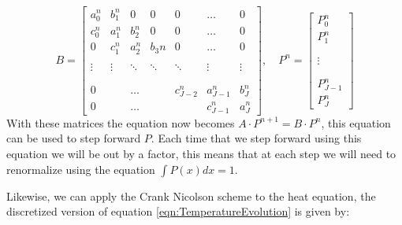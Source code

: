 \begin{equation}
B = 
\begin{bmatrix}
	a_0^{n} & b_1^{n}     & 0                 & 0          & 0                    & \dots            & 0        \\
	c_0^{n} & a_1^{n}     & b_2^{n}      & 0          & 0                    & \dots            & 0        \\
	0                & c_1^{n} & a_2^{n}      & b_3{n} & 0                    & \dots            & 0        \\
			     &               &                   &             &                      &                     &           \\
	\vdots         & \vdots     & \ddots         & \ddots   & \ddots            & \vdots           & \vdots \\
			     &               &                   &             &                      &                     &           \\
			     &               &                   &             &                      &                     &           \\
	0                &               & \dots           &             &  c_{J-2}^{n} & a_{J-1}^{n}  & b_J^{n} \\
	0                &               & \dots           &             &                     &  c_{J-1}^{n} & a_J^{n}
\end{bmatrix}
,\quad P^{n} =
\begin{bmatrix}
P_0^{n}       \\
P_1^n          \\
                    \\
                    \\
\vdots           \\
                    \\
                    \\
P_{J-1}^{n} \\
P_J^{n}
\end{bmatrix}
\end{equation}
With these matrices the equation now becomes $A \cdot P^{n+1} = B \cdot P^n$, this equation can be used to step forward $P$.
Each time that we step forward using this equation we will be out by a factor, this means that at each step we will need to renormalize using the equation $\int P(x) dx = 1$.

Likewise, we can apply the Crank Nicolson scheme to the heat equation, the discretized version of equation \ref{eqn:TemperatureEvolution} is given by:


